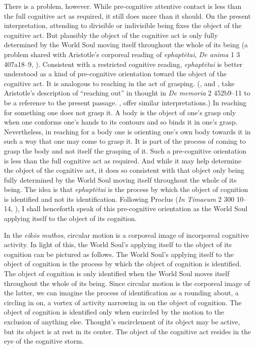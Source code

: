 There is a problem, however. While pre-cognitive attentive contact is less than the full cognitive act as required, it still does more than it should. On the present interpretation, attending to divisible or indivisible being fixes the object of the cognitive act. But plausibly the object of the cognitive act is only fully determined by the World Soul moving itself throughout the whole of its being (a problem shared with Aristotle's corporeal reading of \emph{ephaptētai}, \emph{De anima} 1 3 407a18--9, \citealt[84, 98--9 n26]{Lee:1976xs}). Consistent with a restricted cognitive reading, \emph{ephaptētai} is better understood as a kind of pre-cognitive orientation toward the object of the cognitive act. It is analogous to reaching in the act of grasping. (\citealt[276]{Ross:1906fk}, and \citealt[404 n335]{Cherniss:1944aa}, take Aristotle's description of ``reaching out'' in thought in \emph{De memoria} 2 452b9--11 to be a reference to the present passage. \citealt[98--9 n26]{Lee:1976xs}, \citealt[87]{Corcilius:2018bd} \citealt[134]{Betegh:2019fq} offer similar interpretations.) In reaching for something one does not grasp it. A body is the object of one's grasp only when one conforms one's hands to its contours and so binds it in one's grasp. Nevertheless, in reaching for a body one is orienting one's own body towards it in such a way that one may come to grasp it. It is part of the process of coming to grasp the body and not itself the grasping of it. Such a pre-cognitive orientation is less than the full cognitive act as required. And while it may help determine the object of the cognitive act, it does so consistent with that object only being fully determined by the World Soul moving itself throughout the whole of its being. The idea is that \emph{ephaptētai} is the process by which the object of cognition is identified and not its identification. Following Proclus (\emph{In Timaeum} 2 300 10--14, \citealt{Diehl:1903re}), I shall henceforth speak of this pre-cognitive orientation as the World Soul applying itself to the object of its cognition. 

In the \emph{eikōs muthos}, circular motion is a corporeal image of incorporeal cognitive activity. In light of this, the World Soul's applying itself to the object of its cognition can be pictured as follows. The World Soul's applying itself to the object of cognition is the process by which the object of cognition is identified. The object of cognition is only identified when the World Soul moves itself throughout the whole of its being. Since circular motion is the corporeal image of the latter, we can imagine the process of identification as a rounding about, a circling in on, a vortex of activity narrowing in on the object of cognition. The object of cognition is identified only when encircled by the motion to the exclusion of anything else. Thought's encirclement of its object may be active, but its object is at rest in its center. The object of the cognitive act resides in the eye of the cognitive storm.



